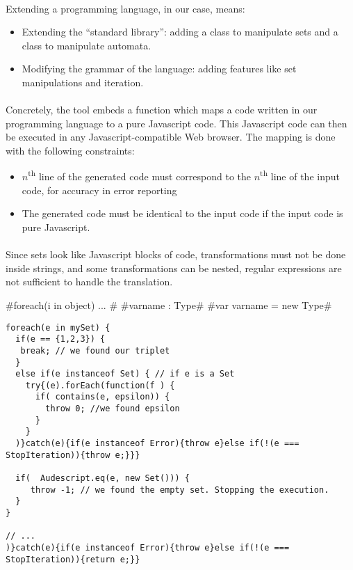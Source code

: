 \paragraph{}
Extending a programming language, in our case, means:

\begin{itemize}
   \item{Extending the ``standard library'': adding a class to manipulate sets and a class to manipulate automata.}
   \item{Modifying the grammar of the language: adding features like set manipulations and iteration.}
\end{itemize}

\paragraph{}
Concretely, the tool embeds a function which maps a code written in our programming language to a pure Javascript code. This Javascript code can then be executed in any Javascript-compatible Web browser.
The mapping is done with the following constraints:
\begin{itemize}
   \item{ $ n $\textsuperscript{th} line  of the generated code must correspond to the $ n $\textsuperscript{th}  line of the input code, for accuracy in error reporting}
   \item{ The generated code must be identical to the input code if the input code is pure Javascript.}
\end{itemize}

\paragraph{}
Since sets look like Javascript blocks of code, transformations must not be done inside strings, and some transformations can be nested, regular expressions are not sufficient to handle the translation.

\DefineShortVerb{\#}
#foreach(i in object) { ... }#
#varname : Type#
#var varname = new Type#
\UndefineShortVerb{\#}

\lstset{numbers=none, frame=none}

\newsavebox\foreachinput
\begin{lrbox}{\foreachinput}
\begin{minipage}{0.5\textwidth}
 \begin{lstlisting}
foreach(e in mySet) {
  if(e == {1,2,3}) {
   break; // we found our triplet
  }
  else if(e instanceof Set) { // if e is a Set
    try{(e).forEach(function(f ) {
      if( contains(e, epsilon)) {
        throw 0; //we found epsilon
      }
    }
  )}catch(e){if(e instanceof Error){throw e}else if(!(e === StopIteration)){throw e;}}}

  if(  Audescript.eq(e, new Set())) {
     throw -1; // we found the empty set. Stopping the execution.
  }
}

// ...
)}catch(e){if(e instanceof Error){throw e}else if(!(e === StopIteration)){return e;}}
 \end{lstlisting}
\end{minipage}
\end{lrbox}


